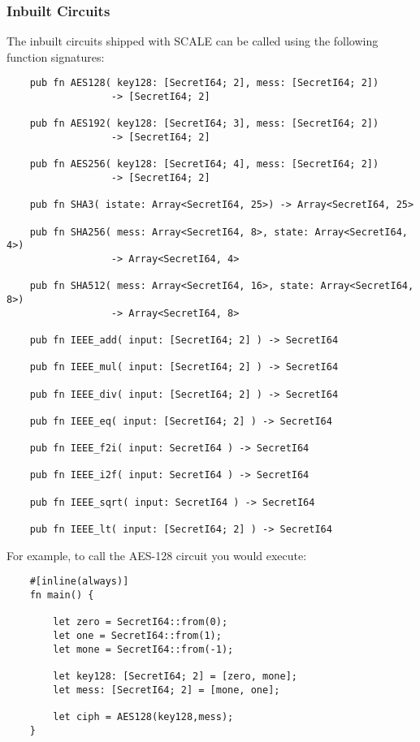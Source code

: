 \subsubsection{Inbuilt Circuits}
The inbuilt circuits shipped with SCALE can be called using the
following function signatures:
\begin{lstlisting}
    pub fn AES128( key128: [SecretI64; 2], mess: [SecretI64; 2]) 
                  -> [SecretI64; 2]

    pub fn AES192( key128: [SecretI64; 3], mess: [SecretI64; 2]) 
                  -> [SecretI64; 2]

    pub fn AES256( key128: [SecretI64; 4], mess: [SecretI64; 2]) 
                  -> [SecretI64; 2]

    pub fn SHA3( istate: Array<SecretI64, 25>) -> Array<SecretI64, 25>

    pub fn SHA256( mess: Array<SecretI64, 8>, state: Array<SecretI64, 4>) 
                  -> Array<SecretI64, 4>

    pub fn SHA512( mess: Array<SecretI64, 16>, state: Array<SecretI64, 8>) 
                  -> Array<SecretI64, 8>

    pub fn IEEE_add( input: [SecretI64; 2] ) -> SecretI64

    pub fn IEEE_mul( input: [SecretI64; 2] ) -> SecretI64

    pub fn IEEE_div( input: [SecretI64; 2] ) -> SecretI64

    pub fn IEEE_eq( input: [SecretI64; 2] ) -> SecretI64

    pub fn IEEE_f2i( input: SecretI64 ) -> SecretI64

    pub fn IEEE_i2f( input: SecretI64 ) -> SecretI64

    pub fn IEEE_sqrt( input: SecretI64 ) -> SecretI64

    pub fn IEEE_lt( input: [SecretI64; 2] ) -> SecretI64
\end{lstlisting}
For example, to call the AES-128 circuit you would execute:
\begin{lstlisting}
    #[inline(always)]
    fn main() {

        let zero = SecretI64::from(0);
        let one = SecretI64::from(1);
        let mone = SecretI64::from(-1);
    
        let key128: [SecretI64; 2] = [zero, mone];
        let mess: [SecretI64; 2] = [mone, one];
    
        let ciph = AES128(key128,mess);
    }
\end{lstlisting}



